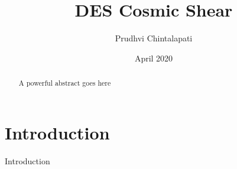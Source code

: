 \documentclass[11pt]{article}
\title{DES Cosmic Shear}
\author{Prudhvi Chintalapati}
\date{April 2020}
\def\fold{Chapters}
\begin{document}
\maketitle
\begin{abstract}
    A powerful abstract goes here 
\end{abstract}

\section{Introduction}
Introduction






\end{document}
